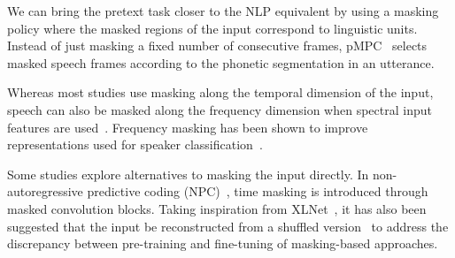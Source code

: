 We can bring the pretext task closer to the NLP equivalent by using a masking policy where the masked regions of the input correspond to linguistic units. Instead of just masking a fixed number of consecutive frames, pMPC~\cite{yue2021pMPC} selects masked speech frames according to the phonetic segmentation in an utterance. 

Whereas most studies use masking along the temporal dimension of the input, speech can also be masked along the frequency dimension when spectral input features are used~\cite{wang2020unsupervised,liu2021tera}. Frequency masking has been shown to improve representations used for speaker classification~\cite{liu2021tera}. 



Some studies explore alternatives to masking the input directly. In non-autoregressive predictive coding (NPC)~\cite{liu21l_interspeech}, time masking is introduced through masked convolution blocks. Taking inspiration from XLNet~\cite{XLNet}, it has also been suggested that the input be reconstructed from a shuffled version~\cite{song20d_interspeech} to address the discrepancy between pre-training and fine-tuning of masking-based approaches.

